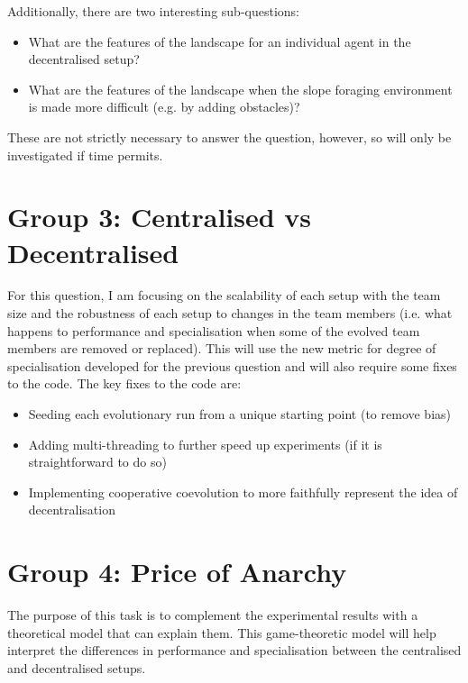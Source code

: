 \documentclass[12pt]{article}
\begin{document}
Additionally, there are two interesting sub-questions:

\begin{itemize}

\item What are the features of the landscape for an individual agent in the decentralised setup?
\item What are the features of the landscape when the slope foraging environment is made more difficult (e.g. by adding obstacles)?

\end{itemize}

These are not strictly necessary to answer the question, however, so will only be investigated if time permits.


\section{Group 3: Centralised vs Decentralised}

For this question, I am focusing on the scalability of each setup with the team size and the robustness of each setup to changes in the team members (i.e. what happens to performance and specialisation when some of the evolved team members are removed or replaced). This will use the new metric for degree of specialisation developed for the previous question and will also require some fixes to the code. The key fixes to the code are:\\

\begin{itemize}

\item Seeding each evolutionary run from a unique starting point (to remove bias)
\item Adding multi-threading to further speed up experiments (if it is straightforward to do so)
\item Implementing cooperative coevolution to more faithfully represent the idea of decentralisation

\end{itemize}

\section{Group 4: Price of Anarchy}

The purpose of this task is to complement the experimental results with a theoretical model that can explain them. This game-theoretic model will help interpret the differences in performance and specialisation between the centralised and decentralised setups.\\
\end{document}

